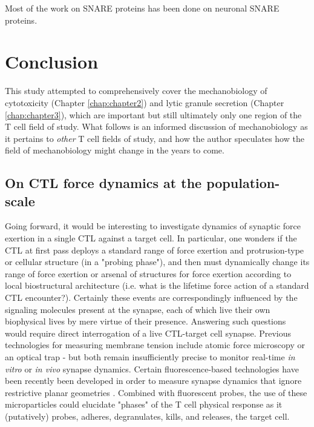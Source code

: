 Most of the work on SNARE proteins has been done on neuronal SNARE proteins.  

\section{Conclusion}

This study attempted to comprehensively cover the mechanobiology of cytotoxicity (Chapter \ref{chap:chapter2}) and lytic granule secretion (Chapter \ref{chap:chapter3}), which are important but still ultimately only one region of the T cell field of study. What follows is an informed discussion of mechanobiology as it pertains to \textit{other} T cell fields of study,  and how the author speculates how the field of mechanobiology might change in the years to come.

\subsection{On CTL force dynamics at the population-scale}

Going forward, it would be interesting to investigate dynamics of synaptic force exertion in a single CTL against a target cell. In particular, one wonders if the CTL at first pass deploys a standard range of force exertion and protrusion-type or cellular structure (in a "probing phase"), and then must dynamically change its range of force exertion or arsenal of structures for force exertion according to local biostructural architecture (i.e. what is the lifetime force action of a standard CTL encounter?). Certainly these events are correspondingly influenced by the signaling molecules present at the synapse, each of which live their own biophysical lives by mere virtue of their presence. Answering such questions would require direct interrogation of a live CTL-target cell synapse. Previous technologies for measuring membrane tension include atomic force microscopy or an optical trap - but both remain insufficiently precise to monitor real-time \textit{in vitro} or \textit{in vivo} synapse dynamics. Certain fluorescence-based technologies have been recently been developed in order to measure synapse dynamics that ignore restrictive planar geometries \cite{Vorselen2020}. Combined with fluorescent probes, the use of these microparticles could elucidate "phases" of the T cell physical response as it (putatively) probes, adheres, degranulates, kills, and releases, the target cell.


